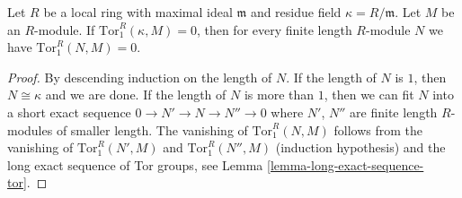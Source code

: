 \begin{lemma}
\label{lemma-prepare-local-criterion-flatness}
Let $R$ be a local ring with maximal ideal $\mathfrak m$
and residue field $\kappa = R/\mathfrak m$.
Let $M$ be an $R$-module. If $\text{Tor}_1^R(\kappa, M) = 0$,
then for every finite length $R$-module $N$ we have
$\text{Tor}_1^R(N, M) = 0$.
\end{lemma}

\begin{proof}
By descending induction on the length of $N$.
If the length of $N$ is $1$, then $N \cong \kappa$
and we are done. If the length of $N$ is more than
$1$, then we can fit $N$ into a short exact sequence
$0 \to N' \to N \to N'' \to 0$ where $N'$, $N''$ are
finite length $R$-modules of smaller length.
The vanishing of $\text{Tor}_1^R(N, M)$ follows
from the vanishing of $\text{Tor}_1^R(N', M)$
and $\text{Tor}_1^R(N'', M)$ (induction hypothesis)
and the long exact sequence of Tor groups, see Lemma
\ref{lemma-long-exact-sequence-tor}.
\end{proof}

